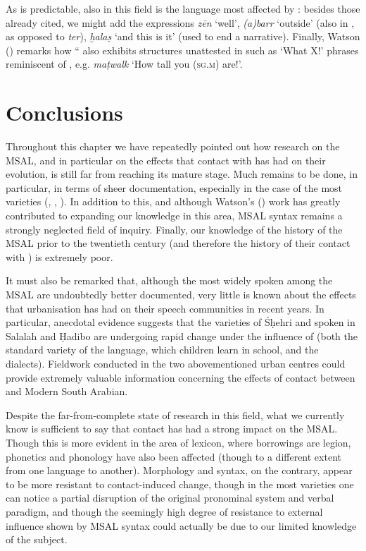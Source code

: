 \documentclass[output=paper]{langsci/langscibook}
\begin{document}
As is predictable, also in this field  is the language most affected by : besides those already cited, we might add the expressions \textit{zēn} ‘well’, \textit{(a)barr} ‘outside’ (also in , as opposed to  \textit{ter}), \textit{ḫalaṣ} ‘and this is it’ (used to end a narrative). Finally, Watson (\citeyear[3]{Watson2012}) remarks how `` also exhibits structures unattested in  such as ‘What X!’ phrases reminiscent of , e.g. \textit{maṭwalk} ‘How tall you (\textsc{sg.m}) are!’.

\section{Conclusions}\label{sec:4}

Throughout this chapter we have repeatedly pointed out how research on the MSAL, and in particular on the effects that contact with  has had on their evolution, is still far from reaching its mature stage. Much remains to be done, in particular, in terms of sheer documentation, especially in the case of the most  varieties (, , ). In addition to this, and although Watson’s (\citeyear{Watson2012}) work has greatly contributed to expanding our knowledge in this area, MSAL syntax remains a strongly neglected field of inquiry. Finally, our knowledge of the history of the MSAL prior to the twentieth century (and therefore the history of their contact with ) is extremely poor. 

It must also be remarked that, although the most widely spoken among the MSAL are undoubtedly better documented, very little is known about the effects that urbanisation has had on their speech communities in recent years. In particular, anecdotal evidence suggests that the varieties of Śḥehri and  spoken in Salalah and Ḥadibo are undergoing rapid change under the influence of  (both the standard variety of the language, which children learn in school, and the dialects). Fieldwork conducted in the two abovementioned urban centres could provide extremely valuable information concerning the effects of contact between  and Modern South Arabian.

Despite the far-from-complete state of research in this field, what we currently know is sufficient to say that contact has had a strong impact on the MSAL. Though this is more evident in the area of lexicon, where borrowings are legion, phonetics and phonology have also been affected (though to a different extent from one language to another). Morphology and syntax, on the contrary, appear to be more resistant to contact-induced change, though in the most  varieties one can notice a partial disruption of the original pronominal system and verbal paradigm, and though the seemingly high degree of resistance to external influence shown by MSAL syntax could actually be due to our limited knowledge of the subject.
\end{document}
